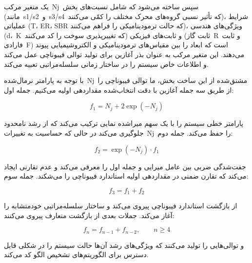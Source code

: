 \documentclass[12pt, a4paper]{article}
\begin{document}
یک متغیر مرکب Nj سپس ساخته می‌شود که شامل نسبت‌های بخش (مانند s1/s2 و s3/s4 که تأثیر نسبی گروه‌های محرک مختلف را کمّی می‌کنند)، شرایط عملیاتی (T، ER، SBR که حالت ترمودینامیکی را فراهم می‌کنند)، ویژگی‌های هندسی (d، K که تغییرپذیری سوخت را کد می‌کنند) و ثابت‌های فیزیکی (ثابت گاز R و ثابت فارادی F) است که ابعاد را بین مقیاس‌های ترمودینامیکی و الکتروشیمیایی پیوند می‌دهند. این متغیر مرکب به عنوان بذر آغازین برای تولید توالی فیبوناچی عمل می‌کند و اطلاعات خاص سیستم را در ساختار زمانی سلسله‌مراتبی تعبیه می‌کند.

با توجه به پارامتر نرمال‌شده Nj مشتق‌شده از این ساخت بخش، ما توالی فیبوناچی را از طریق سه جمله آغازین با دقت انتخاب‌شده مقداردهی اولیه می‌کنیم. جمله اول:

\begin{equation}
f_{1}=N_{j}+2\exp(-N_{j})
\end{equation}

پارامتر خطی سیستم را با یک سهم میراشده نمایی ترکیب می‌کند که از رشد نامحدود جلوگیری می‌کند در حالی که حساسیت به تغییرات Nj را حفظ می‌کند. جمله دوم:

\begin{equation}
f_{2}=\exp(-N_{j})\cdot f_{1}
\end{equation}

جفت‌شدگی ضربی بین عامل میرایی و جمله اول را معرفی می‌کند و عدم تقارنی ایجاد می‌کند که تقارن ضمنی در مقداردهی اولیه استاندارد فیبوناچی را می‌شکند. جمله سوم:

\begin{equation}
f_{3}=f_{1}+f_{2}
\end{equation}

از بازگشت استاندارد فیبوناچی پیروی می‌کند و ساختار سلسله‌مراتبی خودمتشابه را آغاز می‌کند. جملات بعدی از بازگشت متعارف پیروی می‌کنند:

\begin{equation}
f_{n}=f_{n-1}+f_{n-2},\qquad n\ge 4
\end{equation}

و توالی‌هایی را تولید می‌کنند که ویژگی‌های رشد آن‌ها حالت سیستم را در شکلی قابل دسترس برای الگوریتم‌های تشخیص الگو کد می‌کند.
\end{document}
